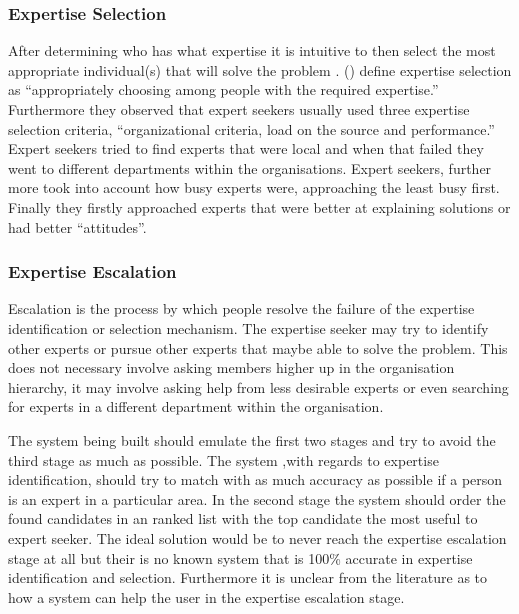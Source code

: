 \documentclass[a4paper,oneside,11pt]{report}
\begin{document}
\subsubsection{Expertise Selection} 
After determining who has what expertise it is intuitive to then select the most appropriate individual(s) that will solve the problem \citeauthor{mcdonalackerman1998}. (\citeyear{mcdonalackerman1998}) define expertise selection as \enquote {appropriately choosing among people with the required expertise.} Furthermore they observed that expert seekers usually used three expertise selection criteria, \enquote {organizational criteria, load on the source and performance.} Expert seekers tried to find experts that were local and when that failed they went to different departments within the organisations. Expert seekers, further more took into account how busy experts were, approaching the least busy first. Finally they firstly approached experts that were better at explaining solutions or had better \enquote {attitudes}.

\subsubsection{Expertise Escalation} 
Escalation is the process by which people resolve the failure of the expertise identification or selection mechanism. The expertise seeker may try to identify other experts or pursue other experts that maybe able to solve the problem.  This does not necessary involve asking members higher up in the organisation hierarchy, it may involve asking help from less desirable experts or even searching for experts in a different department within the organisation\autocite{mcdonalackerman1998}.

The system being built should emulate the first two stages and try to avoid the third stage as much as possible. The system ,with regards to expertise identification, should try to match with as much accuracy as possible if a person is an expert in a particular area. In the second stage the system should order the found candidates in an ranked list with the top candidate the most useful to expert seeker. The ideal solution would be to never reach the expertise escalation stage at all but their is no known system that is 100\% accurate in expertise identification and selection. Furthermore it is unclear from the literature as to how a system can help the user in the expertise escalation stage.
\end{document}
